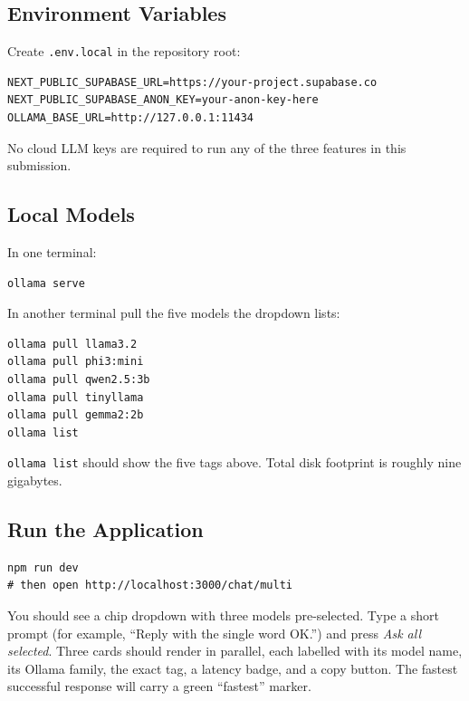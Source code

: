 \documentclass[11pt]{article}
\begin{document}
\subsection{Environment Variables}

Create \texttt{.env.local} in the repository root:

\begin{lstlisting}
NEXT_PUBLIC_SUPABASE_URL=https://your-project.supabase.co
NEXT_PUBLIC_SUPABASE_ANON_KEY=your-anon-key-here
OLLAMA_BASE_URL=http://127.0.0.1:11434
\end{lstlisting}

No cloud LLM keys are required to run any of the three features in
this submission.

\subsection{Local Models}

In one terminal:

\begin{lstlisting}
ollama serve
\end{lstlisting}

In another terminal pull the five models the dropdown lists:

\begin{lstlisting}
ollama pull llama3.2
ollama pull phi3:mini
ollama pull qwen2.5:3b
ollama pull tinyllama
ollama pull gemma2:2b
ollama list
\end{lstlisting}

\texttt{ollama list} should show the five tags above.  Total disk
footprint is roughly nine gigabytes.

\subsection{Run the Application}

\begin{lstlisting}
npm run dev
# then open http://localhost:3000/chat/multi
\end{lstlisting}

You should see a chip dropdown with three models pre-selected.  Type a
short prompt (for example, ``Reply with the single word OK.'')
and press \emph{Ask all selected}.  Three cards should render in
parallel, each labelled with its model name, its Ollama family, the
exact tag, a latency badge, and a copy button.  The fastest
successful response will carry a green ``fastest'' marker.
\end{document}
